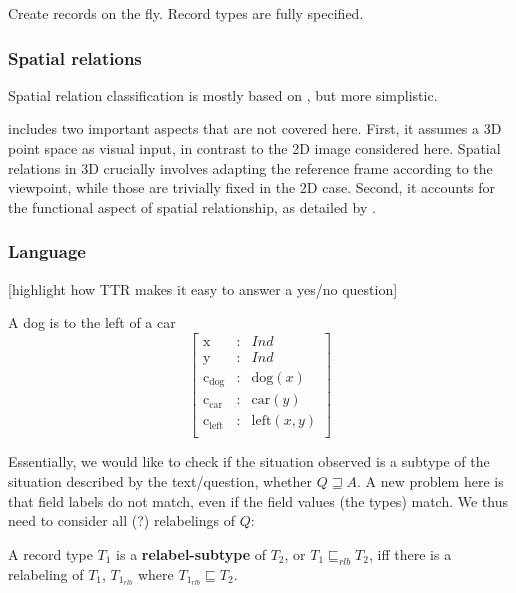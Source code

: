 \documentclass[11pt, a4paper]{article}
\begin{document}
Create records on the fly.
Record types are fully specified.



\subsubsection{Spatial relations}

Spatial relation classification is mostly based on \cite{ttrspat}, but more simplistic.

\cite{ttrspat} includes two important aspects that are not covered here.
First, it assumes a 3D point space as visual input, in contrast to the 2D image considered here.
Spatial relations in 3D crucially involves adapting the reference frame according to the viewpoint, while those are trivially fixed in the 2D case.
Second, it accounts for the functional aspect of spatial relationship, as detailed by \cite{CoventryClassificationExtrageometricInfluences2004}.




\subsubsection{Language}

[highlight how TTR makes it easy to answer a yes/no question]

A dog is to the left of a car
\begin{equation}\left[\begin{array}{rcl}
\text{x} &:& Ind\\
\text{y} &:& Ind\\
\text{c}_\text{dog} &:& \text{dog}(x)\\
\text{c}_\text{car} &:& \text{car}(y)\\
\text{c}_\text{left} &:& \text{left}(x, y)\\
\end{array}\right]\end{equation}


Essentially, we would like to check if the situation observed is a subtype of the situation described by the text/question, whether $Q \sqsupseteq A$. A new problem here is that field labels do not match, even if the field values (the types) match. We thus need to consider all (?) relabelings of $Q$:

A record type $T_1$ is a \textbf{relabel-subtype} of $T_2$, or $T_1 \sqsubseteq_{rlb} T_2$,  iff there is a relabeling of $T_1$, $T_{1_{rlb}}$ where $T_{1_{rlb}} \sqsubseteq T_2$.
\end{document}
